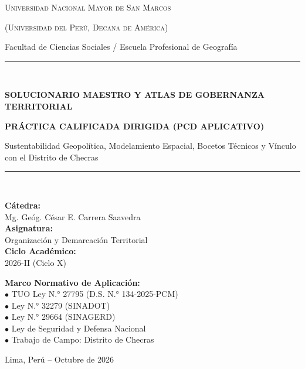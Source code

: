 \documentclass[11pt,a4paper]{article}
\begin{document}
\begin{titlepage}
    \centering
    \vspace*{0.8cm}
    {\scshape\LARGE Universidad Nacional Mayor de San Marcos\par}
    \vspace{0.25cm}
    {\scshape\large (Universidad del Perú, Decana de América)\par}
    \vspace{0.2cm}
    {\large Facultad de Ciencias Sociales / Escuela Profesional de Geografía\par}
    \vspace{1.5cm}
    
    \rule{\linewidth}{1.5pt}\\[0.4cm]
    {\huge\bfseries\color{primary} SOLUCIONARIO MAESTRO Y ATLAS DE GOBERNANZA TERRITORIAL\par}
    \vspace{0.3cm}
    {\Large\bfseries\color{secondary} PRÁCTICA CALIFICADA DIRIGIDA (PCD APLICATIVO)\par}
    \vspace{0.2cm}
    {\large Sustentabilidad Geopolítica, Modelamiento Espacial, Bocetos Técnicos y Vínculo con el Distrito de Checras\par}
    \rule{\linewidth}{1.5pt}\\[1.2cm]
    
    \begin{minipage}{0.48\textwidth}
        \textbf{\large Cátedra:}\\
        {\normalsize Mg. Geóg. César E. Carrera Saavedra}\\
        \textbf{\large Asignatura:}\\
        {\normalsize Organización y Demarcación Territorial}\\
        \textbf{\large Ciclo Académico:}\\
        {\normalsize 2026-II (Ciclo X)}
    \end{minipage}
    \hfill
    \begin{minipage}{0.48\textwidth}
        \textbf{\large Marco Normativo de Aplicación:}\\
        {\footnotesize $\bullet$ TUO Ley N.° 27795 (D.S. N.° 134-2025-PCM)\\
        $\bullet$ Ley N.° 32279 (SINADOT)\\
        $\bullet$ Ley N.° 29664 (SINAGERD)\\
        $\bullet$ Ley de Seguridad y Defensa Nacional\\
        $\bullet$ Trabajo de Campo: Distrito de Checras}
    \end{minipage}
    
    \vfill
    {\large Lima, Perú -- Octubre de 2026\par}
\end{titlepage}
\end{document}
